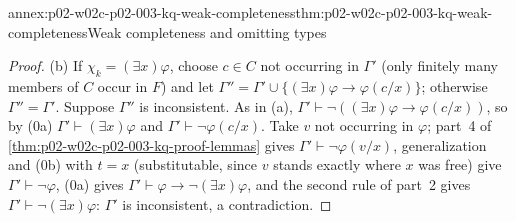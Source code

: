 \begin{annexitem}{annex:p02-w02c-p02-003-kq-weak-completeness}{thm:p02-w02c-p02-003-kq-weak-completeness}{Weak completeness and omitting types}
\begin{proof}
(b) If \(\chi_k=(\exists x)\varphi\), choose \(c\in C\) not occurring in
\(\Gamma'\) (only finitely many members of \(C\) occur in \(F\)) and let
\(\Gamma''=\Gamma'\cup\{(\exists x)\varphi\to\varphi(c/x)\}\); otherwise
\(\Gamma''=\Gamma'\).  Suppose \(\Gamma''\) is inconsistent.  As in (a),
\(\Gamma'\vdash\neg((\exists x)\varphi\to\varphi(c/x))\), so by (0a)
\(\Gamma'\vdash(\exists x)\varphi\) and \(\Gamma'\vdash\neg\varphi(c/x)\).
Take \(v\) not occurring in \(\varphi\); part~4 of
\cref{thm:p02-w02c-p02-003-kq-proof-lemmas} gives
\(\Gamma'\vdash\neg\varphi(v/x)\), generalization and (0b) with \(t=x\)
(substitutable, since \(v\) stands exactly where \(x\) was free) give
\(\Gamma'\vdash\neg\varphi\), (0a) gives
\(\Gamma'\vdash\varphi\to\neg(\exists x)\varphi\), and the second rule of
part~2 gives \(\Gamma'\vdash\neg(\exists x)\varphi\): \(\Gamma'\) is
inconsistent, a contradiction.


\end{proof}
\end{annexitem}
